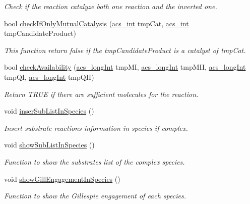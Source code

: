 \begin{DoxyCompactItemize}
\begin{DoxyCompactList}\small\item\em Check if the reaction catalyze both one reaction and the inverted one. \end{DoxyCompactList}\item 
bool \hyperlink{a00003_abdafaeba15b5d32fd35569869c6244d5}{check\-If\-Only\-Mutual\-Catalysis} (\hyperlink{a00016_a8d277355641a098190360234e2ebde35}{acs\-\_\-int} tmp\-Cat, \hyperlink{a00016_a8d277355641a098190360234e2ebde35}{acs\-\_\-int} tmp\-Candidate\-Product)
\begin{DoxyCompactList}\small\item\em This function return false if the tmp\-Candidate\-Product is a catalyst of tmp\-Cat. \end{DoxyCompactList}\item 
bool \hyperlink{a00003_ad3ebcd7ab1c9ba1a0f65b264b97adf33}{check\-Availability} (\hyperlink{a00016_a19319d75f02db4308bc5c0026d98cd85}{acs\-\_\-long\-Int} tmp\-M\-I, \hyperlink{a00016_a19319d75f02db4308bc5c0026d98cd85}{acs\-\_\-long\-Int} tmp\-M\-I\-I, \hyperlink{a00016_a19319d75f02db4308bc5c0026d98cd85}{acs\-\_\-long\-Int} tmp\-Q\-I, \hyperlink{a00016_a19319d75f02db4308bc5c0026d98cd85}{acs\-\_\-long\-Int} tmp\-Q\-I\-I)
\begin{DoxyCompactList}\small\item\em Return T\-R\-U\-E if there are sufficient molecules for the reaction. \end{DoxyCompactList}\item 
void \hyperlink{a00003_af293fafca4582120d88f888d70d8623a}{inser\-Sub\-List\-In\-Species} ()
\begin{DoxyCompactList}\small\item\em Insert substrate reactions information in species if complex. \end{DoxyCompactList}\item 
void \hyperlink{a00003_a5cb194f927ddc7a804a942ca71f062af}{show\-Sub\-List\-In\-Species} ()
\begin{DoxyCompactList}\small\item\em Function to show the substrates list of the complex species. \end{DoxyCompactList}\item 
void \hyperlink{a00003_aef1d3687767151218f3b7379dc230430}{show\-Gill\-Engagement\-In\-Species} ()
\begin{DoxyCompactList}\small\item\em Function to show the Gillespie engagement of each species. \end{DoxyCompactList}\item 

\end{DoxyCompactItemize}
